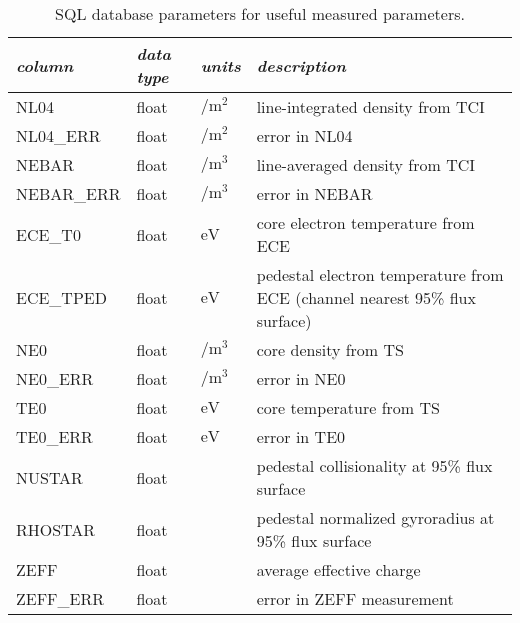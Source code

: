  \begin{longtabu} to 150mm {X[2.348,l]X[1,c]X[1,c]X[4.348,c]}
 \caption{SQL database parameters for useful measured parameters.}\label{tab:sql_plasma} \\

 \toprule
 \emph{column} &
 \emph{data type} &
 \emph{units} &
 \emph{description}
 \\
 \midrule
 \endfirsthead
 \endhead

 \endfoot
 \bottomrule
 \endlastfoot

 NL04 &
 float &
 $\si{\per\meter\squared}$ &
 line-integrated density from TCI
 \\
 NL04\_ERR &
 float &
 $\si{\per\meter\squared}$ &
 error in NL04
 \\
 NEBAR &
 float &
 $\si{\per\meter\cubed}$ &
 line-averaged density from TCI
 \\
 NEBAR\_ERR &
 float &
 $\si{\per\meter\cubed}$ &
 error in NEBAR
 \\
 ECE\_T0 &
 float &
 $\si{\electronvolt}$ &
 core electron temperature from ECE
 \\
 ECE\_TPED &
 float &
 $\si{\electronvolt}$ &
 pedestal electron temperature from ECE (channel nearest 95\% flux surface)
 \\
 NE0 &
 float &
 $\si{\per\meter\cubed}$ &
 core density from TS
 \\
 NE0\_ERR &
 float &
 $\si{\per\meter\cubed}$ &
 error in NE0
 \\
 TE0 &
 float &
 $\si{\electronvolt}$ &
 core temperature from TS
 \\
 TE0\_ERR &
 float &
 $\si{\electronvolt}$ &
 error in TE0
 \\
 NUSTAR &
 float &
 &
 pedestal collisionality at 95\% flux surface
 \\
 RHOSTAR &
 float &
 &
 pedestal normalized gyroradius at 95\% flux surface
 \\
 ZEFF &
 float &
 &
 average effective charge
 \\
 ZEFF\_ERR &
 float &
 &
 error in ZEFF measurement
 \\

 \end{longtabu}

